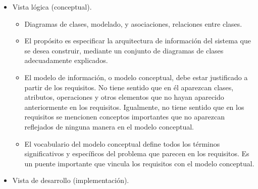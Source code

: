 \documentclass[12pt, twoside, openright]{report} %
\begin{document}
\begin{itemize}
    \item Vista lógica (conceptual).
		\begin{itemize}
			
			\item
				Diagramas de clases, modelado, y asociaciones, relaciones entre
				clases.
			\item
				El propósito es especificar la arquitectura de información del
				sistema que se desea construir, mediante un conjunto de
				diagramas de clases adecuadamente explicados.
			\item
				El modelo de información, o modelo conceptual, debe estar
				justificado a partir de los requisitos. No tiene sentido que en
				él aparezcan clases, atributos, operaciones y otros elementos
				que no hayan aparecido anteriormente en los requisitos.
				Igualmente, no tiene sentido que en los requisitos se mencionen
				conceptos importantes que no aparezcan reflejados de ninguna
				manera en el modelo conceptual.
			\item
				El vocabulario del modelo conceptual define todos los términos
				significativos y específicos del problema que parecen en los
				requisitos. Es un puente importante que vincula los requisitos
				con el modelo conceptual.
		\end{itemize}
    \item Vista de desarrollo (implementación).
    	\begin{itemize}
      

\end{itemize}
\end{itemize}
\end{document}
